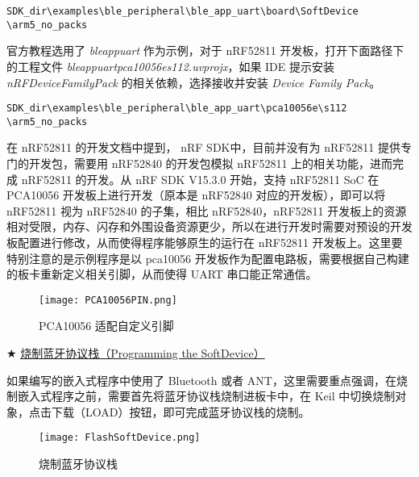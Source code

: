 \documentclass{WHUResearch}  %
\begin{document}
{\setmainfont{Courier New Italic}                          %
\begin{lstlisting}
SDK_dir\examples\ble_peripheral\ble_app_uart\board\SoftDevice
\arm5_no_packs
\end{lstlisting}}

官方教程选用了 \textit{ble\textunderscore app\textunderscore uart} 作为示例，对于 nRF52811 开发板，打开下面路径下的工程文件 \textit{ble\textunderscore app\textunderscore uart\textunderscore pca10056e\textunderscore s112.uvprojx}，如果 IDE 提示安装 \textit{nRF\textunderscore DeviceFamilyPack} 的相关依赖，选择接收并安装 \textit{Device Family Pack}。

{\setmainfont{Courier New Italic}                          %
\begin{lstlisting}
SDK_dir\examples\ble_peripheral\ble_app_uart\pca10056e\s112
\arm5_no_packs
\end{lstlisting}}

在 nRF52811 的开发文档中提到， nRF SDK中，目前并没有为 nRF52811 提供专门的开发包，需要用 nRF52840 的开发包模拟 nRF52811 上的相关功能，进而完成 nRF52811 的开发。从 nRF SDK V15.3.0 开始，支持 nRF52811 SoC 在 PCA10056 开发板上进行开发（原本是 nRF52840 对应的开发板），即可以将 nRF52811 视为 nRF52840 的子集，相比 nRF52840，nRF52811 开发板上的资源相对受限，内存、闪存和外围设备资源更少，所以在进行开发时需要对预设的开发板配置进行修改，从而使得程序能够原生的运行在 nRF52811 开发板上。这里要特别注意的是示例程序是以 pca10056 开发板作为配置电路板，需要根据自己构建的板卡重新定义相关引脚，从而使得 UART 串口能正常通信。
\begin{figure}[htbp]
\centering
  \texttt{[image: PCA10056PIN.png]}
  \caption{PCA10056 适配自定义引脚}
  \label{fig:PCA10056PIN}
\end{figure}

$\bigstar$ \href{https://infocenter.nordicsemi.com/index.jsp?topic=\%2Fug_gsg_keil\%2FUG\%2Fgsg\%2Fprogram_sd.html}{烧制蓝牙协议栈（Programming the SoftDevice）}

如果编写的嵌入式程序中使用了 Bluetooth\textsuperscript{\textregistered} 或者 ANT\textsuperscript{\texttrademark}，这里需要重点强调，在烧制嵌入式程序之前，需要首先将蓝牙协议栈烧制进板卡中，在 Keil 中切换烧制对象，点击下载（LOAD）按钮，即可完成蓝牙协议栈的烧制。
\begin{figure}[htbp]
\centering
  \texttt{[image: FlashSoftDevice.png]}
  \caption{烧制蓝牙协议栈}
  \label{fig:FlashSoftDevice}
\end{figure}
\end{document}
